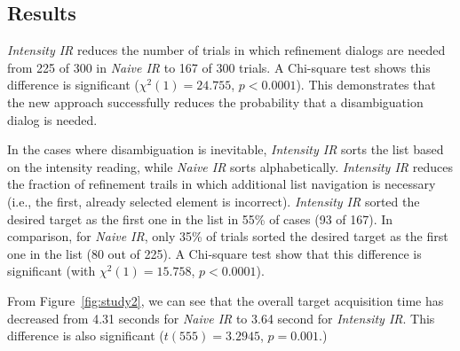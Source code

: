 






\subsection{Results}
{\em Intensity IR} reduces the number of trials in which refinement dialogs are needed from 225 of 300 in {\em Naive IR} to 167 of 300 trials. A Chi-square test shows this difference is significant ($\chi^2(1) = 24.755$, $p < 0.0001$). This demonstrates that the new approach successfully reduces the probability that a disambiguation dialog is needed.

In the cases where disambiguation is inevitable, {\em Intensity IR} sorts the list based on the intensity reading, while {\em Naive IR} sorts alphabetically. {\em Intensity IR} reduces the fraction of refinement trails in which additional list navigation is necessary (i.e., the first, already selected element is incorrect).  {\em Intensity IR} sorted the desired target as the first one in the list in 55\% of cases (93 of 167). In comparison, for {\em Naive IR}, only 35\% of trials sorted the desired target as the first one in the list (80 out of 225). A Chi-square test show that this difference is significant (with $\chi^2(1) = 15.758$, $p < 0.0001$).

From Figure~\ref{fig:study2}, we can see that the overall target acquisition time has decreased from 4.31 seconds for {\em Naive IR} to 3.64 second for {\em Intensity IR}. This difference is also significant ($t(555)=3.2945$, $p=0.001$.) 





